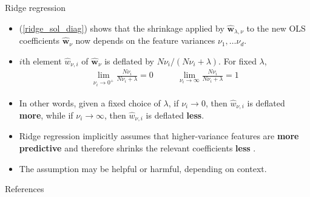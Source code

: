 \documentclass{beamer}
\numberwithin{equation}{section}
\newcommand{\aref}[1]{\alert{\ref{#1}}}
\begin{document}
\begin{frame}{Ridge regression}
    \begin{itemize}
        \item 
        (\aref{ridge_sol_diag}) shows that the shrinkage applied by
        $ \hat{\mathbf{w}}_{\lambda, \nu} $ to the new OLS coefficients
        $ \hat{\mathbf{w}}_\nu $ now depends on the feature variances
        $ \nu_1, \ldots \nu_d $.

        \item
        $ i $th element $ \hat{w}_{\nu, i} $ of $ \hat{\mathbf{w}}_\nu $ is
        deflated by $ N\nu_i / (N\nu_i + \lambda) $. For fixed $ \lambda $,
        \begin{equation*}
            \begin{array}{cc}
                \displaystyle\lim_{\nu_i \rightarrow 0^+}
                \frac{N\nu_i}{N\nu_i + \lambda} = 0 \quad & \quad
                \displaystyle\lim_{\nu_i \rightarrow \infty}
                \frac{N\nu_i}{N\nu_i + \lambda} = 1
            \end{array}
        \end{equation*}

        \item
        In other words, given a fixed choice of $ \lambda $, if
        $ \nu_i\rightarrow 0 $, then $ \hat{w}_{\nu, i} $ is deflated
        \textbf{more}, while if $ \nu_i \rightarrow \infty $, then
        $ \hat{w}_{\nu, i} $ is deflated \textbf{less}.

        \item
        \alert{
            Ridge regression implicitly assumes that higher-variance features
            are \textbf{more predictive} and therefore shrinks the relevant
            coefficients \textbf{less}
        }.

        \item
        The assumption may be helpful or harmful, depending on context.
    \end{itemize}
\end{frame}

\begin{frame}{References}
    
    
\end{frame}
\end{document}

